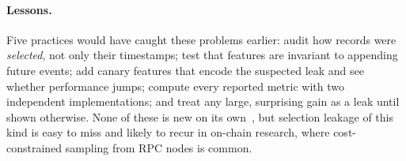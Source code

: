 \paragraph{Lessons.}
Five practices would have caught these problems earlier: audit how records were \emph{selected}, not only their timestamps; test that features are invariant to appending future events; add canary features that encode the suspected leak and see whether performance jumps; compute every reported metric with two independent implementations; and treat any large, surprising gain as a leak until shown otherwise. None of these is new on its own~\citep{kapoor2023leakage,lopezdeprado2018advances}, but selection leakage of this kind is easy to miss and likely to recur in on-chain research, where cost-constrained sampling from RPC nodes is common.

